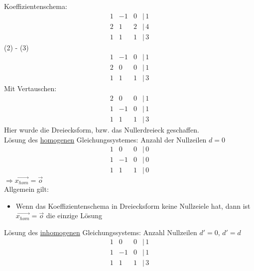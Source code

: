 \documentclass{article}
\begin{document}
Koeffizientenschema:
\begin{equation*}
    \begin{matrix}
        1&-1&0&|\,1\\
        2&1&2&|\,4\\
        1&1&1&|\,3
    \end{matrix}
\end{equation*}
(2) - (3)
\begin{equation*}
    \begin{matrix}
        1&-1&0&|\,1\\
        2&0&0&|\,1\\
        1&1&1&|\,3
    \end{matrix}
\end{equation*}
Mit Vertauschen:
\begin{equation*}
    \begin{matrix}
        2&0&0&|\,1\\
        1&-1&0&|\,1\\
        1&1&1&|\,3
    \end{matrix}
\end{equation*}
Hier wurde die Dreiecksform, bzw. das Nullerdreieck geschaffen.\\
Lösung des \underline{homogenen} Gleichungssystemes: Anzahl der Nullzeilen $d=0$
\begin{equation*}
    \begin{matrix}
        1&0&0&|\,0\\1&-1&0&|\,0\\1&1&1&|\,0
    \end{matrix}
\end{equation*}
$\Rightarrow \vec{x_{hom}} = \vec{o}$\\
Allgemein gilt:\\
\begin{itemize}
    \item Wenn das Koeffizientenschema in Dreiecksform keine Nullzeiele hat, dann ist $\vec{x_{hom}} = \vec{o}$ die einzige Lösung
\end{itemize}
Lösung des \underline{inhomogenen} Gleichungssystems: Anzahl Nullzeilen $d' = 0,\,d' = d$\\
\begin{equation*}
    \begin{matrix}
        1&0&0&|\,1\\1&-1&0&|\,1\\1&1&1&|\,3\\
    \end{matrix}
\end{equation*}
\end{document}
